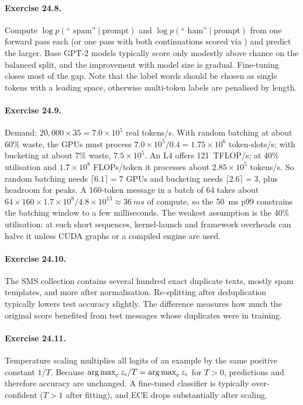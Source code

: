 \paragraph{Exercise 24.8.} Compute $\log p(\text{`` spam''}\mid\text{prompt})$ and
$\log p(\text{`` ham''}\mid\text{prompt})$ from one forward pass each (or one pass with
both continuations scored via ) and predict the larger. Base
GPT-2 models typically score only modestly above chance on the balanced split, and the
improvement with model size is gradual. Fine-tuning closes most of the gap. Note that
the label words should be chosen as single tokens with a leading space, otherwise
multi-token labels are penalised by length.

\paragraph{Exercise 24.9.} Demand: $20{,}000\times35 = 7.0\times10^5$ real tokens/s. With
random batching at about 60\% waste, the GPUs must process $7.0\times10^5/0.4=1.75\times
10^6$ token-slots/s; with bucketing at about 7\% waste, $7.5\times10^5$. An L4 offers
\SI{121}{TFLOP/s}; at 40\% utilisation and $1.7\times10^8$ FLOPs/token it processes
about $2.85\times10^5$ tokens/s. So random batching needs $\lceil 6.1\rceil = 7$ GPUs
and bucketing needs $\lceil 2.6\rceil=3$, plus headroom for peaks. A 160-token message
in a batch of 64 takes about $64\times160\times1.7\times10^8/4.8\times10^{13}\approx
\SI{36}{ms}$ of compute, so the \SI{50}{ms} p99 constrains the batching window to a few
milliseconds. The weakest assumption is the 40\% utilisation: at such short sequences,
kernel-launch and framework overheads can halve it unless CUDA graphs or a compiled
engine are used.

\paragraph{Exercise 24.10.} The SMS collection contains several hundred exact duplicate
texts, mostly spam templates, and more after normalisation. Re-splitting after
deduplication typically lowers test accuracy slightly. The difference measures how much
the original score benefited from test messages whose duplicates were in training.

\paragraph{Exercise 24.11.} Temperature scaling multiplies all logits of an example by the
same positive constant $1/T$. Because $\operatorname*{arg\,max}_c z_c/T = \operatorname*{arg\,max}_c z_c$ for $T>0$,
predictions and therefore accuracy are unchanged. A fine-tuned classifier is typically
over-confident ($T>1$ after fitting), and ECE drops substantially after scaling.

